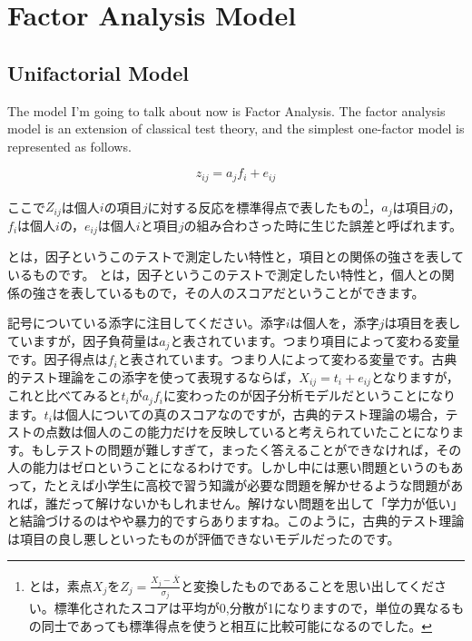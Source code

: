 \documentclass{ltjsbook}
\begin{document}
\section{Factor Analysis Model}
\subsection{Unifactorial Model}
The model I'm going to talk about now is Factor Analysis. The factor analysis model is an extension of classical test theory, and the simplest one-factor model is represented as follows.

\[ z_{ij} = a_j f_i + e_{ij} \]

ここで$Z_{ij}$は個人$i$の項目$j$に対する反応を標準得点で表したもの\footnote{とは，素点$X_j$を$Z_j = \frac{X_j - \bar{X}}{\sigma_j}$と変換したものであることを思い出してください。標準化されたスコアは平均が0,分散が1になりますので，単位の異なるもの同士であっても標準得点を使うと相互に比較可能になるのでした。}，$a_j$は項目$j$の，$f_i$は個人$i$の，$e_{ij}$は個人$i$と項目$j$の組み合わさった時に生じた誤差と呼ばれます。

とは，因子というこのテストで測定したい特性と，項目との関係の強さを表しているものです。
とは，因子というこのテストで測定したい特性と，個人との関係の強さを表しているもので，その人のスコアだということができます。

記号についている添字に注目してください。添字$i$は個人を，添字$j$は項目を表していますが，因子負荷量は$a_j$と表されています。つまり項目によって変わる変量です。因子得点は$f_i$と表されています。つまり人によって変わる変量です。古典的テスト理論をこの添字を使って表現するならば，$X_{ij} = t_i + e_{ij}$となりますが，これと比べてみると$t_i$が$a_jf_i$に変わったのが因子分析モデルだということになります。$t_i$は個人についての真のスコアなのですが，古典的テスト理論の場合，テストの点数は個人のこの能力だけを反映していると考えられていたことになります。もしテストの問題が難しすぎて，まったく答えることができなければ，その人の能力はゼロということになるわけです。しかし中には悪い問題というのもあって，たとえば小学生に高校で習う知識が必要な問題を解かせるような問題があれば，誰だって解けないかもしれません。解けない問題を出して「学力が低い」と結論づけるのはやや暴力的ですらありますね。このように，古典的テスト理論は項目の良し悪しといったものが評価できないモデルだったのです。
\end{document}
